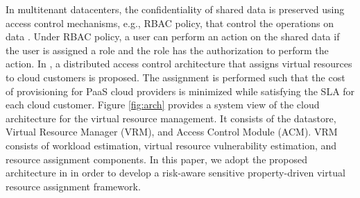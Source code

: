 In multitenant datacenters, the confidentiality of shared data is preserved using access control mechanisms, e.g., RBAC policy, that control the operations on data \cite{alcaraz10}. Under RBAC policy, a user can perform an action on the shared data if the user is assigned a role and the role has the authorization to perform the action. In \cite{almutairi2012distributed}, a distributed access control architecture that assigns virtual resources to cloud customers is proposed. The assignment is performed such that the cost of provisioning for PaaS cloud providers is minimized while satisfying the SLA for each cloud customer. Figure \ref{fig:arch} provides a system view of the cloud architecture for the virtual resource management. It consists of the datastore, Virtual Resource Manager (VRM), and Access Control Module (ACM). VRM consists of workload estimation, virtual resource vulnerability estimation, and resource assignment components. In this paper, we adopt the proposed architecture in  \cite{almutairi2012distributed} in order to develop a risk-aware sensitive property-driven virtual resource assignment framework.

